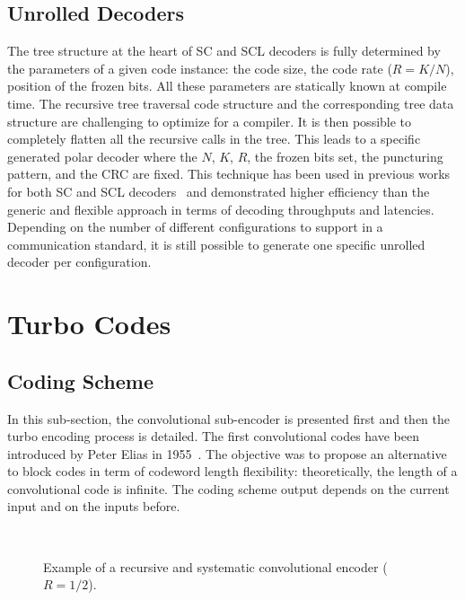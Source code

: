 \subsection{Unrolled Decoders}

The tree structure at the heart of SC and SCL decoders is fully determined by
the parameters of a given code instance: the code size, the code rate ($R = K /
N$), position of the frozen bits. All these parameters are statically known at
compile time. The recursive tree traversal code structure and the corresponding
tree data structure are challenging to optimize for a compiler. It is then
possible to completely flatten all the recursive calls in the tree. This leads
to a specific generated polar decoder where the $N$, $K$, $R$, the frozen bits
set, the puncturing pattern, and the CRC are fixed. This technique has been used
in previous works for both SC and SCL decoders~\cite{Sarkis2014,Cassagne2015c,
Cassagne2016b,Sarkis2016} and demonstrated higher efficiency than the generic
and flexible approach in terms of decoding throughputs and latencies. Depending
on the number of different configurations to support in a communication
standard, it is still possible to generate one specific unrolled decoder per
configuration.

\section{Turbo Codes}

\subsection{Coding Scheme}

In this sub-section, the convolutional sub-encoder is presented first and then
the turbo encoding process is detailed. The first convolutional codes have been
introduced by Peter Elias in 1955~\cite{Elias1955}. The objective was to propose
an alternative to block codes in term of codeword length flexibility:
theoretically, the length of a convolutional code is infinite. The coding scheme
output depends on the current input and on the inputs before.

\begin{figure}[htp]
  \centering
  \quad
  \\
  \caption{Example of a recursive and systematic convolutional encoder ($R =
    1/2$).}
  \label{fig:alg_turbo_sub_encoder}
\end{figure}

